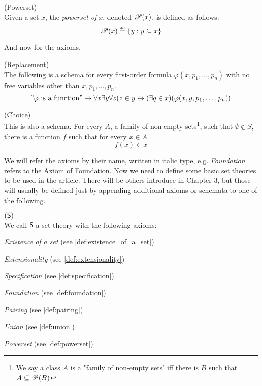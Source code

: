 \begin{definition}{(Powerset)}\\
Given a set $x$, the \emph{powerset of $x$}, denoted $\mathscr{P} (x)$, is defined as follows:
\begin{equation}
\power{x} \defeq \{y: y \subseteq x\}
\end{equation}
\end{definition}

And now for the axioms.
\begin{definition}{(Replacement)}\label{def:replacement}\\
The following is a schema for every first-order formula $\varphi(x, p_1, \ldots, p_n)$ with no free variables other than $x, p_1, \ldots, p_n$.
\begin{equation}
"\varphi\mbox{ is a function}"\rightarrow \forall x \exists y \forall z (z \in y \leftrightarrow (\exists q \in x)(\varphi(x, y, p_1, \ldots, p_n))
\end{equation}
\end{definition}

\begin{definition}{(Choice)}\label{def:choice}\\
This is also a schema. For every $A$, a family of non-empty sets\footnote{We say a class $A$ is a "family of non-empty sets" iff there is $B$ such that $A \subseteq \mathscr{P} (B)$}, such that $\emptyset \not\in S$, there is a function $f$ such that for every $x \in A$
\begin{equation}
f(x) \in x
\end{equation}
\end{definition}

We will refer the axioms by their name, written in italic type, e.g. \emph{Foundation} refers to the Axiom of Foundation. Now we need to define some basic set theories to be used in the article. There will be others introduce in Chapter 3, but those will usually be defined just by appending additional axioms or schemata to one of the following.

\begin{definition}{$(\sf{S})$}\label{def:s}\\
We call $\sf{S}$ a set theory with the following axioms:
\bce[(i)]
\item \emph{Existence of a set} (see \ref{def:existence_of_a_set})
\item \emph{Extensionality} (see \ref{def:extensionality})
\item \emph{Specification} (see \ref{def:specification})
\item \emph{Foundation} (see \ref{def:foundation})
\item \emph{Pairing} (see \ref{def:pairing})
\item \emph{Union} (see \ref{def:union})
\item \emph{Powerset} (see \ref{def:powerset})
\ece
\end{definition}

